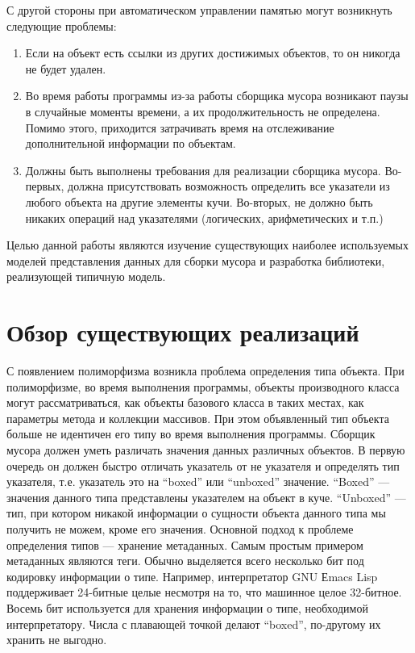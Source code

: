 С другой стороны при автоматическом управлении памятью могут возникнуть следующие проблемы:
\begin{enumerate}
\item Если на объект есть ссылки из других достижимых объектов, то он никогда не будет удален.
\item Во время работы программы из-за работы сборщика мусора возникают паузы в случайные моменты времени, а их продолжительность не определена.
Помимо этого, приходится затрачивать время на отслеживание дополнительной информации по объектам.
\item Должны быть выполнены  требования для реализации сборщика мусора.
Во-первых, должна присутствовать возможность определить все указатели из любого объекта на другие элементы кучи.
Во-вторых, не должно быть никаких операций над указателями (логических, арифметических и т.п.)
\end{enumerate}

Целью данной работы являются изучение существующих наиболее используемых моделей представления данных для сборки мусора и
разработка библиотеки, реализующей типичную модель.

\section{Обзор существующих реализаций}

С появлением полиморфизма возникла проблема определения типа объекта. При полиморфизме, во время выполнения программы,
объекты производного класса могут рассматриваться,
как объекты базового класса в таких местах, как параметры метода и коллекции
массивов. При этом объявленный тип объекта больше не идентичен его типу во время выполнения программы.
Сборщик мусора должен уметь различать значения данных различных объектов.
В первую очередь он должен быстро отличать указатель от не указателя и определять тип указателя,
т.е. указатель это на ``boxed''  или ``unboxed''  значение.
``Boxed'' --- значения данного типа представлены указателем на объект в куче. 
``Unboxed''  --- тип, при котором никакой информации о сущности объекта данного типа мы получить не можем, кроме его значения.
Основной подход к проблеме определения типов — хранение метаданных.
Самым простым примером метаданных являются теги.
Обычно выделяется всего несколько бит под кодировку информации о типе.
Например, интерпретатор
GNU Еmacs Lisp поддерживает 24-битные целые несмотря на то,
что машинное целое 32-битное.
Восемь бит используется для хранения информации о типе, необходимой интерпретатору.
Числа с плавающей точкой делают ``boxed'', по-другому их хранить не выгодно.

